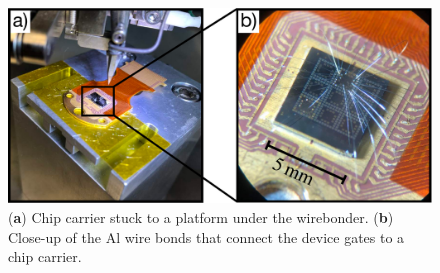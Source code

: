 \begin{figure}[!bht]
 \begin{center}
 \includegraphics[width=1.0\textwidth]{figures/appendix/figure21.pdf}
 \caption[Wirebonding a Chip]{\label{fig:appx/wirebond} 
 (\textbf{a}) Chip carrier stuck to a platform under the wirebonder. (\textbf{b}) Close-up of the Al wire bonds that connect the device gates to a chip carrier.}
 \end{center}
\end{figure}